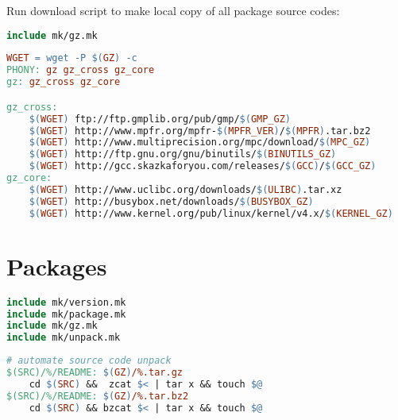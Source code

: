 Run download script to make local copy of all package source codes:
\begin{lstlisting}[language=make,title=Makefile]
include mk/gz.mk
\end{lstlisting}
\begin{lstlisting}[language=make,title=mk/gz]
WGET = wget -P $(GZ) -c	
PHONY: gz gz_cross gz_core
gz: gz_cross gz_core

gz_cross:
	$(WGET) ftp://ftp.gmplib.org/pub/gmp/$(GMP_GZ)
	$(WGET) http://www.mpfr.org/mpfr-$(MPFR_VER)/$(MPFR).tar.bz2
	$(WGET) http://www.multiprecision.org/mpc/download/$(MPC_GZ)
	$(WGET) http://ftp.gnu.org/gnu/binutils/$(BINUTILS_GZ)
	$(WGET) http://gcc.skazkaforyou.com/releases/$(GCC)/$(GCC_GZ)
gz_core:
	$(WGET) http://www.uclibc.org/downloads/$(ULIBC).tar.xz
	$(WGET) http://busybox.net/downloads/$(BUSYBOX_GZ)
	$(WGET) http://www.kernel.org/pub/linux/kernel/v4.x/$(KERNEL_GZ)
\end{lstlisting}

\clearpage
\section{Packages}

\begin{lstlisting}[language=make,title=Makefile]
include mk/version.mk
include mk/package.mk
include mk/gz.mk
include mk/unpack.mk
\end{lstlisting}

\begin{lstlisting}[language=make,title=mk/unpack]
# automate source code unpack
$(SRC)/%/README: $(GZ)/%.tar.gz
	cd $(SRC) &&  zcat $< | tar x && touch $@
$(SRC)/%/README: $(GZ)/%.tar.bz2
	cd $(SRC) && bzcat $< | tar x && touch $@
\end{lstlisting}

\clearpage
{}%


